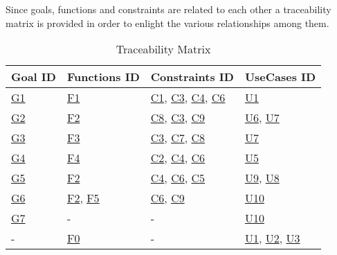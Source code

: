 Since goals, functions and constraints are related to each other a traceability matrix is provided in order to enlight the various relationships among them.
\begin{flushleft}

\begin{table}[htp]
\centering
\begin{tabular}{|l|l|l|l|}
\hline
Goal ID&Functions ID&Constraints ID&UseCases ID\\
\hline
\hyperlink{G1}{G1}&\hyperlink{sec:f1}{F1}&\hyperlink{C1}{C1}, \hyperlink{C3}{C3}, \hyperlink{C4}{C4}, \hyperlink{C6}{C6}&\hyperlink{tab:reportcreationtab}{U1}\\
\hline
\hyperlink{G2}{G2}&\hyperlink{sec:f2}{F2}&\hyperlink{C8}{C8}, \hyperlink{C3}{C3}, \hyperlink{C9}{C9}&\hyperlink{tab:dataminingtab}{U6}, \hyperlink{tab:dataminingofficertab}{U7}\\
\hline
\hyperlink{G3}{G3}&\hyperlink{sec:f3}{F3}&\hyperlink{C3}{C3}, \hyperlink{C7}{C7}, \hyperlink{C8}{C8}&\hyperlink{tab:dataminingofficertab}{U7}\\
\hline
\hyperlink{G4}{G4}&\hyperlink{sec:f4}{F4}&\hyperlink{C2}{C2}, \hyperlink{C4}{C4}, \hyperlink{C6}{C6}&\hyperlink{tab:AutomaticTrafficTicket}{U5}\\
\hline
\hyperlink{G5}{G5}&\hyperlink{sec:f2}{F2}&\hyperlink{C4}{C4}, \hyperlink{C6}{C6}, \hyperlink{C5}{C5}&\hyperlink{tab:dataminingvehicleofficerstab}{U9}, \hyperlink{tab:dataminingvehicletab}{U8}\\
\hline
\hyperlink{G6}{G6}&\hyperlink{sec:f2}{F2}, \hyperlink{sec:f5}{F5}&\hyperlink{C6}{C6}, \hyperlink{C9}{C9}&\hyperlink{tab:statisticsconsultingtab}{U10}\\
\hline
\hyperlink{G7}{G7}&-&-&\hyperlink{tab:statisticsconsultingtab}{U10}\\
\hline
-&\hyperlink{sec:f0}{F0}&-&\hyperlink{tab:signupusecase}{U1}, \hyperlink{tab:loginusecase}{U2}, \hyperlink{tab:recoverpasswordusecase}{U3}\\
\hline

\end{tabular}

\caption{Traceability Matrix} 

\end{table}

\end{flushleft}